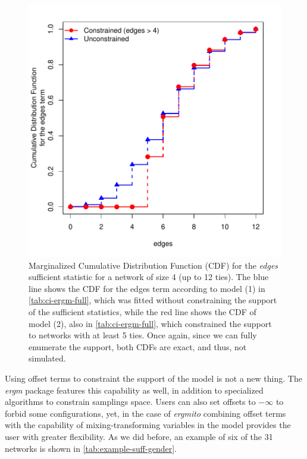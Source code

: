 \documentclass[review, nonatbib,doubleblind]{elsarticle/elsarticle}
\begin{document}
\begin{figure}[ht]
    \centering
    \includegraphics[width=.7\linewidth]{figures/cdf-4-edges.pdf}
    \caption{Marginalized Cumulative Distribution Function (CDF) for the \textit{edges} sufficient statistic for a network of size 4 (up to 12 ties). The blue line shows the CDF for the edges term according to model (1) in \autoref{tab:ci-ergm-full}, which was fitted without constraining the support of the sufficient statistics, while the red line shows the CDF of model (2), also in \autoref{tab:ci-ergm-full}, which constrained the support to networks with at least 5 ties. Once again, since we can fully enumerate the support, both CDFs are exact, and thus, not simulated.}
    \label{fig:cdf-constrained}
\end{figure}

Using offset terms to constraint the support of the model is not a new thing. The \textit{ergm} package features this capability as well, in addition to specialized algorithms to constrain samplings space. Users can also set offsets to $-\infty$ to forbid some configurations, yet, in the case of \textit{ergmito} combining offset terms with the capability of mixing-transforming variables in the model provides the user with greater flexibility. As we did before, an example of six of the 31 networks is shown in \autoref{tab:example-suff-gender}.
\end{document}
